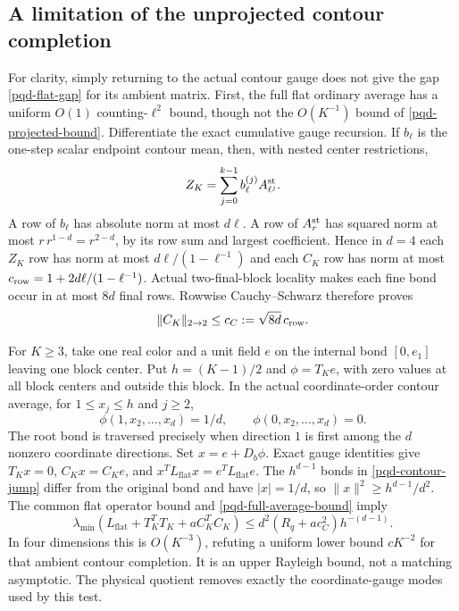 \documentclass[11pt]{article}
\theoremstyle{remark}
\begin{document}
\subsection{A limitation of the unprojected contour completion}
\label{pqd-contour-section}

For clarity, simply returning to the actual contour gauge does not give
the gap \eqref{pqd-flat-gap} for its ambient matrix. First, the full flat
ordinary average has a uniform $O(1)$ counting-$\ell^2$ bound, though
not the $O(K^{-1})$ bound of \eqref{pqd-projected-bound}. Differentiate
the exact cumulative gauge recursion. If $b_\ell$ is the one-step
scalar endpoint contour mean, then, with nested center restrictions,
\begin{equation}
 Z_K=\sum_{j=0}^{k-1}b_\ell^{(j)}A_{\ell^j}^{\rm st}.
 \label{pqd-gauge-recursion}
\end{equation}
A row of $b_\ell$ has absolute norm at most $d\ell$. A row of
$A_r^{\rm st}$ has squared norm at most
$r\,r^{1-d}=r^{2-d}$, by its row sum and largest coefficient. Hence in
$d=4$ each $Z_K$ row has norm at most $d\ell/(1-\ell^{-1})$ and each
$C_K$ row has norm at most
$c_{\rm row}=1+2d\ell/(1-\ell^{-1})$. Actual two-final-block locality
makes each fine bond occur in at most $8d$ final rows. Rowwise
Cauchy--Schwarz therefore proves
\begin{equation}
 \|C_K\|_{2\to2}\le c_C:=\sqrt{8d}\,c_{\rm row}.
 \label{pqd-full-average-bound}
\end{equation}

For $K\ge3$, take one real color and a unit field $e$ on the internal bond $[0,e_1]$
leaving one block center. Put $h=(K-1)/2$ and $\phi=T_Ke$, with zero
values at all block centers and outside this block. In the actual
coordinate-order contour average, for $1\le x_j\le h$ and $j\ge2$,
\begin{equation}
 \phi(1,x_2,\ldots,x_d)=1/d,\qquad
 \phi(0,x_2,\ldots,x_d)=0.\label{pqd-contour-jump}
\end{equation}
The root bond is traversed precisely when direction $1$ is first among
the $d$ nonzero coordinate directions. Set $x=e+D_b\phi$. Exact gauge
identities give $T_Kx=0$, $C_Kx=C_Ke$, and
$x^TL_{\mathrm{flat}}x=e^TL_{\mathrm{flat}}e$. The $h^{d-1}$ bonds in
\eqref{pqd-contour-jump} differ from the original bond and have
$|x|=1/d$, so $\|x\|^2\ge h^{d-1}/d^2$. The common flat operator
bound and \eqref{pqd-full-average-bound} imply
\begin{equation}
 \lambda_{\min}(L_{\mathrm{flat}}+T_K^TT_K+aC_K^TC_K)
 \le d^2(R_q+ac_C^2)h^{-(d-1)}.
 \label{pqd-contour-obstruction}
\end{equation}
In four dimensions this is $O(K^{-3})$, refuting a uniform lower bound
$cK^{-2}$ for that ambient contour completion. It is an upper Rayleigh
bound, not a matching asymptotic. The physical quotient removes exactly
the coordinate-gauge modes used by this test.
\end{document}
